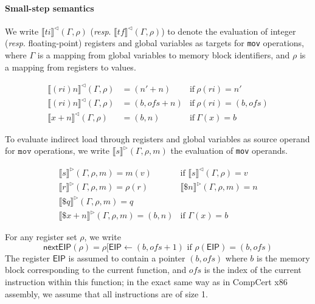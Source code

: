 \paragraph{Small-step semantics}

We write $\llbracket \mathit{ti} \rrbracket^\triangleleft(\Gamma, \rho)$
(\emph{resp}. $\llbracket \mathit{tf} \rrbracket^\triangleleft(\Gamma, \rho)$)
to denote the evaluation of integer (\emph{resp}. floating-point) registers
and global variables as targets for \texttt{mov} operations, where
$\Gamma$ is a mapping from global variables to memory block
identifiers, and $\rho$ is a mapping from registers to values.

\[
\begin{array}{lll}
\llbracket (\mathit{ri})n \rrbracket^\triangleleft(\Gamma, \rho) & = (n' + n) & \text{if} ~ \rho(\mathit{ri}) = n' \\
\llbracket (\mathit{ri})n \rrbracket^\triangleleft(\Gamma, \rho) & = (b, \mathit{ofs}+n) & \text{if} ~ \rho(\mathit{ri}) = (b, \mathit{ofs}) \\
\llbracket x + n  \rrbracket^\triangleleft(\Gamma, \rho) & = (b, n) & \text{if} ~ \Gamma(x) = b
\end{array}
\]

To evaluate indirect load through registers and global variables as
source operand for $\mathtt{mov}$ operations, we write $\llbracket s
\rrbracket^\triangleright(\Gamma, \rho, m)$ the evaluation of
\texttt{mov} operands.

\[
\begin{array}{ll}
\llbracket s \rrbracket^\triangleright(\Gamma, \rho, m)  = m(v) &
\text{if }  \llbracket s \rrbracket^\triangleleft(\Gamma, \rho) = v 
\\
\llbracket r \rrbracket^\triangleright(\Gamma, \rho, m)= \rho(r) &
\llbracket \$ n \rrbracket^\triangleright(\Gamma, \rho, m)  = n 
\\
\llbracket \$ q \rrbracket^\triangleright(\Gamma, \rho, m)  = q 
\\
\llbracket \$ x+n \rrbracket^\triangleright(\Gamma, \rho, m)  = (b, n)  &
\text{if }  \Gamma(x)  = b 
\end{array}
\]

For any register set $\rho$, we write 
\[\mathsf{nextEIP}(\rho) =
\rho[\mathsf{EIP} \leftarrow (b, \mathit{ofs}+1) \text{ if }\rho(\mathsf{EIP})
  = (b, \mathit{ofs})\]%
The register $\mathsf{EIP}$ is assumed to contain a
  pointer $(b, \mathit{ofs})$ where $b$ is the memory block
  corresponding to the current function, and $\mathit{ofs}$ is the
  index of the current instruction within this function; in the exact
  same way as in CompCert x86 assembly, we assume that all
  instructions are of size 1.

